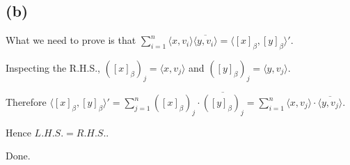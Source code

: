 \documentclass[12pt]{article}%
\begin{document}
\subsection{(b)}
What we need to prove is that $\sum_{i=1}^n \langle x,v_i\rangle \overline{\langle y,v_i\rangle}=\langle [x]_\beta , [y]_\beta \rangle'.$

Inspecting the R.H.S., $([x]_\beta)_j=\langle x,v_j\rangle$ and $([y]_\beta)_j=\langle y,v_j\rangle.$

Therefore $\langle [x]_\beta , [y]_\beta \rangle'=\sum_{j=1}^{n} ([x]_\beta)_j \cdot \overline{([y]_\beta)_j}=\sum_{i=1}^{n} \langle x,v_j\rangle \cdot \overline{\langle y,v_j\rangle}.$

Hence $L.H.S.=R.H.S..$

Done.
\end{document}
